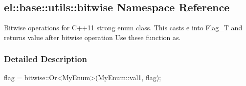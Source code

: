 \hypertarget{a00191}{}\subsection{el\+:\+:base\+:\+:utils\+:\+:bitwise Namespace Reference}
\label{a00191}


Bitwise operations for C++11 strong enum class. This casts e into Flag\+\_\+\+T and returns value after bitwise operation Use these function as.  




\subsubsection{Detailed Description}

\begin{DoxyPre}flag = bitwise::Or<MyEnum>(MyEnum::val1, flag);\end{DoxyPre}
 